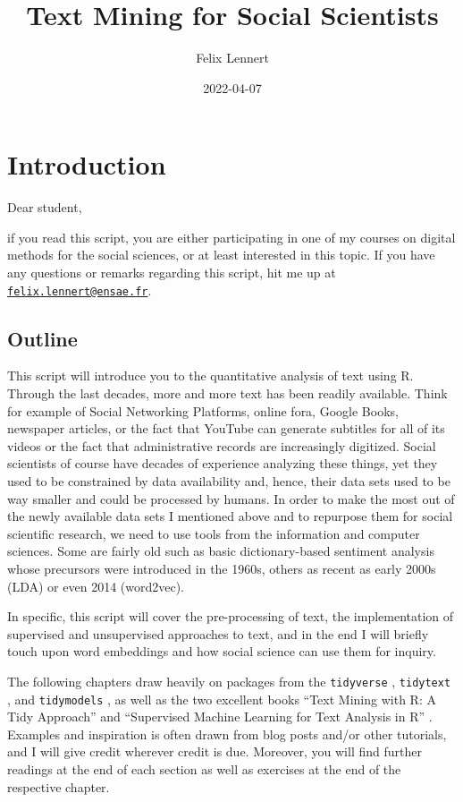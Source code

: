\documentclass[
]{book}
\title{Text Mining for Social Scientists}
\author{Felix Lennert}
\date{2022-04-07}
\begin{document}
\maketitle

{
\setcounter{tocdepth}{1}
\tableofcontents
}
\hypertarget{introduction}{%
\chapter{Introduction}\label{introduction}}

Dear student,

if you read this script, you are either participating in one of my courses on digital methods for the social sciences, or at least interested in this topic. If you have any questions or remarks regarding this script, hit me up at \href{mailto:felix.lennert@ensae.fr}{\nolinkurl{felix.lennert@ensae.fr}}.

\hypertarget{outline}{%
\section{Outline}\label{outline}}

This script will introduce you to the quantitative analysis of text using R. Through the last decades, more and more text has been readily available. Think for example of Social Networking Platforms, online fora, Google Books, newspaper articles, or the fact that YouTube can generate subtitles for all of its videos or the fact that administrative records are increasingly digitized. Social scientists of course have decades of experience analyzing these things, yet they used to be constrained by data availability and, hence, their data sets used to be way smaller and could be processed by humans. In order to make the most out of the newly available data sets I mentioned above and to repurpose them for social scientific research, we need to use tools from the information and computer sciences. Some are fairly old such as basic dictionary-based sentiment analysis whose precursors were introduced in the 1960s, others as recent as early 2000s (LDA) or even 2014 (word2vec).

In specific, this script will cover the pre-processing of text, the implementation of supervised and unsupervised approaches to text, and in the end I will briefly touch upon word embeddings and how social science can use them for inquiry.

The following chapters draw heavily on packages from the \texttt{tidyverse} \citep{wickham2019c}, \texttt{tidytext} \citep{silge2016}, and \texttt{tidymodels} \citep{kuhn2020}, as well as the two excellent books ``Text Mining with R: A Tidy Approach'' \citep{silge2017} and ``Supervised Machine Learning for Text Analysis in R'' \citep{hvitfeldt2022}. Examples and inspiration is often drawn from blog posts and/or other tutorials, and I will give credit wherever credit is due. Moreover, you will find further readings at the end of each section as well as exercises at the end of the respective chapter.
\end{document}
